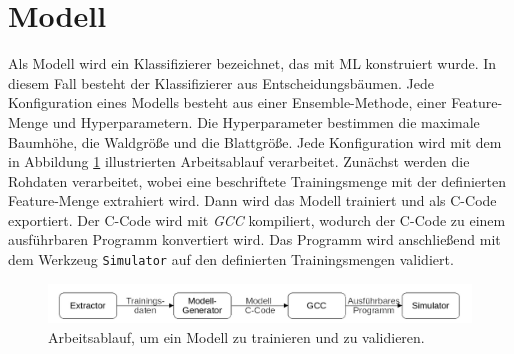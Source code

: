 \section{Modell}
Als Modell wird ein Klassifizierer bezeichnet, das mit ML konstruiert wurde. In diesem Fall besteht der Klassifizierer aus Entscheidungsbäumen. Jede Konfiguration eines Modells besteht aus einer
Ensemble-Methode, einer Feature-Menge und Hyperparametern. Die Hyperparameter bestimmen die maximale Baumhöhe, die Waldgröße und die Blattgröße.
\newline
\newline
Jede Konfiguration wird mit dem in Abbildung \ref{fig:model_workflow} illustrierten Arbeitsablauf verarbeitet. Zunächst werden die Rohdaten verarbeitet, wobei eine beschriftete Trainingsmenge mit der definierten
Feature-Menge extrahiert wird. Dann wird das Modell trainiert und als C-Code exportiert. Der C-Code wird mit \textit{GCC} kompiliert, wodurch der C-Code zu einem ausführbaren Programm konvertiert wird. Das Programm
wird anschließend mit dem Werkzeug \texttt{Simulator} auf den definierten Trainingsmengen validiert.
\begin{figure}
    \centering
    \includegraphics[width=\linewidth]{images/model_workflow.jpg}
    \caption{Arbeitsablauf, um ein Modell zu trainieren und zu validieren.}
    \label{fig:model_workflow}
\end{figure}


